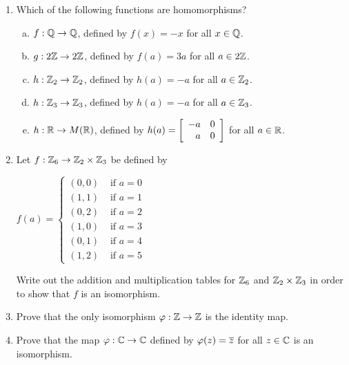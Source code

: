 \documentclass[11pt,fleqn,dvipsnames,usenames]{article}
\begin{document}
\begin{enumerate}
\item Which of the following functions are homomorphisms?
\begin{enumerate}[(a)]
\item $f:\Q\to\Q$, defined by $f(x) = -x$ for all $x\in \Q$.
\item $g:2\Z\to2\Z$, defined by $f(a) = 3a$ for all $a\in2\Z$.
\item $h:\Z_2\to\Z_2$, defined by $h(a) = -a$ for all $a\in\Z_2$.
\item $h:\Z_3\to\Z_3$, defined by $h(a) = -a$ for all $a\in\Z_3$.
\item $h:\R\to M(\R)$, defined by $h(a) = \MATRIX{rr}{-a & 0\\a & 0}$ for all $a\in\R$.
\end{enumerate}
\item Let $f:\Z_6\to\Z_2\times\Z_3$ be defined by
\begin{center}
$f(a) = \begin{cases}(0,0) & \text{ if }a = 0\\(1,1) & \text{ if }a=1\\(0,2) & \text{ if }a=2\\(1,0) & \text{ if }a=3\\(0,1) & \text{ if }a=4\\(1,2) & \text{ if }a=5\end{cases}$
\end{center}
Write out the addition and multiplication tables for $\Z_6$ and $\Z_2\times \Z_3$ in order to show that $f$ is an isomorphism.
\item Prove that the only isomorphism $\varphi:\Z \to \Z$ is the identity map.
\item Prove that the map $\varphi:\C\to\C$ defined by $\varphi(z) = \CC{z}$ for all $z\in \C$ is an isomorphism.
\end{enumerate}
\end{document}
